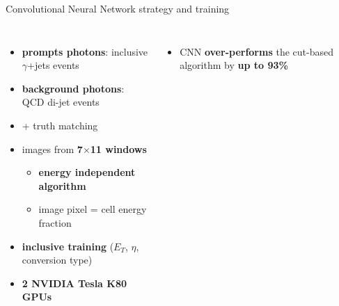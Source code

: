 \begin{frame}{Convolutional Neural Network strategy and training}
\begin{columns}
\begin{itemize}
    \item \textcolor{HHred}{\textbf{prompts photons}}: inclusive $\gamma$+jets events
    \item \textcolor{HHblue}{\textbf{background photons}}: QCD di-jet events 
    \item + truth matching 
    \pause
    \item images from \textbf{7$\times$11 windows} 
    \begin{itemize}
        \item \textbf{energy independent algorithm}
        \item image pixel = cell energy fraction
    \end{itemize}
    \pause
    \item \textbf{inclusive training} ($E_T$, $\eta$, conversion type)
    \item \textbf{2 NVIDIA Tesla K80 GPUs}
    \end{itemize}
    \pause
    \begin{itemize}
        \item CNN \textcolor{HHred}{\textbf{over-performs}} the cut-based algorithm by \textbf{up to 93\%}
    \end{itemize}
    
    


\end{columns}
\end{frame}
